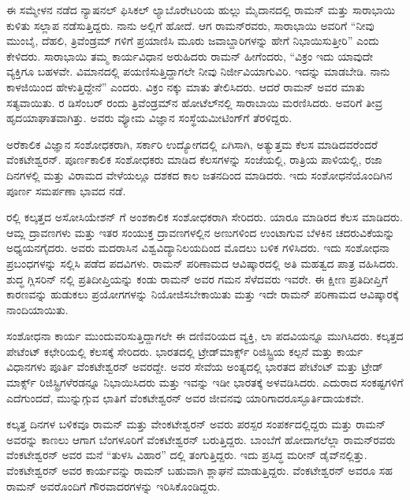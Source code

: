 ಈ ಸಮ್ಮೇಳನ ನಡೆದ ನ್ಯಾಷನಲ್ ಫಿಸಿಕಲ್ ಲ್ಯಾಬೊರೇಟರಿಯ ಹುಲ್ಲು ಮೈದಾನದಲ್ಲಿ ರಾಮನ್ ಮತ್ತು ಸಾರಾಭಾಯಿ ಕುಳಿತು ಸಲ್ಲಾಪ ನಡೆಸುತ್ತಿದ್ದರು. ನಾನು ಅಲ್ಲಿಗೆ ಹೋದೆ. ಆಗ ರಾಮನ್‍ರವರು, ಸಾರಾಭಾಯಿ ಅವರಿಗೆ  “ನೀವು ಮುಂಬೈ, ದೆಹಲಿ, ತ್ರಿವೆಂಡ್ರಮ್ ಗಳಿಗೆ ಪ್ರಯಾಣಿಸಿ ಮೂರು ಜವಾಬ್ದಾರಿಗಳನ್ನು ಹೇಗೆ ನಿಭಾಯಿಸುತ್ತೀರಿ” ಎಂದು ಕೇಳಿದರು. ಸಾರಾಭಾಯಿ ತಮ್ಮ ಕಾರ್ಯವಿಧಾನ ಅರುಹಿದರು ರಾಮನ್ ಹೀಗೆಂದರು, “ವಿಕ್ರಂ ಇದು ಯಾವುದೇ ವ್ಯಕ್ತಿಗೂ ಬಹಳವೇ. ವಿಮಾನದಲ್ಲಿ ಪಯಣಿಸುತ್ತಿದ್ದಾಗಲೇ ನೀವು ನಿರ್ಜೀವಿಯಾಗುವಿರಿ. ಇದನ್ನು ಮಾಡಬೇಡಿ. ನಾನು ಕಾಳಜಿಯಿಂದ ಹೇಳುತ್ತಿದ್ದೇನೆ” ಎಂದರು. ವಿಕ್ರಂ ನಕ್ಕು ಮಾತು ತೇಲಿಸಿದರು. ಆದರೆ ರಾಮನ್ ಅವರ ಮಾತು ಸತ್ಯವಾಯಿತು. ರ ಡಿಸೆಂಬರ್ ರಂದು ತ್ರಿವೆಂಡ್ರಮ್‍ನ ಹೋಟೆಲ್‍ನಲ್ಲಿ ಸಾರಾಬಾಯಿ ಮರಣಿಸಿದರು. ಅವರಿಗೆ ತೀವ್ರ ಹೃದಯಾಘಾತವಾಗಿತ್ತು. ಅವರು ವ್ಯೋಮ ವಿಜ್ಞಾನ ಸಂಸ್ಥೆಯ\break ಮೀಟಿಂಗ್‍ಗೆ ತೆರಳಿದ್ದರು.



ಅರೆಕಾಲಿಕ ವಿಜ್ಞಾನ ಸಂಶೋಧಕರಾಗಿ, ಸರ್ಕಾರಿ ಉದ್ಯೋಗದಲ್ಲಿ ಏಗಿಸಾಗಿ, ಅತ್ಯುತ್ತಮ ಕೆಲಸ ಮಾಡಿದವರೆಂದರೆ ವೆಂಕಟೇಶ್ವರನ್. ಪೂರ್ಣಕಾಲಿಕ ಸಂಶೋಧಕರು ಮಾಡಿದ ಕೆಲಸಗಳನ್ನು ಸಂಜೆಯಲ್ಲಿ, ರಾತ್ರಿಯ ಪಾಳಿಯಲ್ಲಿ, ರಜಾ ದಿನಗಳಲ್ಲಿ ಮತ್ತು ವಿರಾಮದ ವೇಳೆಯಲ್ಲೂ ದಶಕದ ಕಾಲ ಜತನದಿಂದ ಮಾಡಿದರು. ಇದು ಸಂಶೋಧನೆಯೊಂದಿಗಿನ ಪೂರ್ಣ ಸಮರ್ಪಣಾ ಭಾವದ ನಡೆ.

ರಲ್ಲಿ ಕಲ್ಕತ್ತದ ಅಸೋಸಿಯೇಶನ್ ಗೆ ಅಂಶಕಾಲಿಕ ಸಂಶೋಧಕರಾಗಿ ಸೇರಿದರು. ಯಾರೂ ಮಾಡಿರದ ಕೆಲಸ ಮಾಡಿದರು. ಆಮ್ಲ ದ್ರಾವಣಗಳು ಮತ್ತು ಇತರ ಸಂಯುಕ್ತ ದ್ರಾವಣಗಳಲ್ಲಿನ ಅಣುಗಳಿಂದ ಉಂಟಾಗುವ ಬೆಳಕಿನ ಚದರುವಿಕೆಯನ್ನು ಅಧ್ಯಯನಗೈದರು. ಅವರು ಮದರಾಸಿನ ವಿಶ್ವವಿದ್ಯಾನಿಲಯದಿಂದ ಮೊದಲು  ಬಳಿಕ  ಗಳಿಸಿದರು. ಇದು ಸಂಶೋಧನಾ ಪ್ರಬಂಧಗಳನ್ನು ಸಲ್ಲಿಸಿ ಪಡೆದ ಪದವಿಗಳು. ರಾಮನ್ ಪರಿಣಾಮದ ಆವಿಷ್ಕಾರದಲ್ಲಿ ಅತಿ ಮಹತ್ವದ ಪಾತ್ರ ವಹಿಸಿದರು. ಶುದ್ಧ ಗ್ಲಿಸರಿನ್ ನಲ್ಲಿ ಪ್ರತಿದೀಪ್ತಿಯನ್ನು ಕಂಡು ರಾಮನ್ ಅವರ ಗಮನ ಸೆಳೆದವರು ಇವರೇ. ಈ ಕ್ಷೀಣ ಪ್ರತಿದೀಪ್ತಿಗೆ ಕಾರಣವನ್ನು ಹುಡುಕಲು ಪ್ರಯೋಗಗಳನ್ನು ನಿಯೋಜಿಸಬೇಕಾಯಿತು ಮತ್ತು ಇದೇ ರಾಮನ್ ಪರಿಣಾಮದ ಆವಿಷ್ಕಾರಕ್ಕೆ ನಾಂದಿಯಾಯಿತು.

ಸಂಶೋಧನಾ ಕಾರ್ಯ ಮುಂದುವರಿಸುತ್ತಿದ್ದಾಗಲೇ ಈ ದಣಿವರಿಯದ ವ್ಯಕ್ತಿ, ಲಾ ಪದವಿ\-ಯನ್ನೂ ಮುಗಿಸಿದರು. ಕಲ್ಕತ್ತದ ಪೇಟೆಂಟ್ ಕಛೇರಿಯಲ್ಲಿ ಕೆಲಸಕ್ಕೆ ಸೇರಿದರು. ಭಾರತದಲ್ಲಿ ಟ್ರೇಡ್‌ಮಾರ್ಕ್ಸ್ ರಿಜಿಸ್ಟ್ರಿಯ ಕಲ್ಪನೆ ಮತ್ತು ಕಾರ್ಯ ವಿಧಾನಗಳು ಪೂರ್ತಿ ವೆಂಕಟೇಶ್ವರನ್ ಅವರದ್ದೇ. ಅವರ ಸೇವೆಯ ಅಂತ್ಯದಲ್ಲಿ ಭಾರತದ ಪೇಟೆಂಟ್ ಮತ್ತು ಟ್ರೇಡ್ ಮಾರ್ಕ್ಸ್ ರಿಜಿಸ್ಟ್ರಿಗಳೆರಡನ್ನೂ ನಿಭಾಯಿಸಿದರು ಮತ್ತು ಇವನ್ನು ಇಡೀ ಭಾರತಕ್ಕೆ ಅಳವಡಿಸಿದರು. ಎದುರಾದ ಸಂಕಷ್ಟಗಳಿಗೆ ಎದೆಗುಂದದೆ, ಮುನ್ನುಗ್ಗುವ ಛಾತಿಗೆ ವೆಂಕಟೇಶ್ವರನ್ ಅವರ ಜೀವನವು ಯಾರಿಗಾದರೂ\break ಸ್ಫೂರ್ತಿದಾಯಕವೇ.

\vskip 2pt

ಕಲ್ಕತ್ತ ದಿನಗಳ ಬಳಿಕವೂ ರಾಮನ್ ಮತ್ತು ವೇಂಕಟೇಶ್ವರನ್ ಅವರು ಪರಸ್ಪರ ಸಂಪರ್ಕದಲ್ಲಿದ್ದರು ಮತ್ತು ರಾಮನ್ ಅವರನ್ನು ಕಾಣಲು ಆಗಾಗ ಬೆಂಗಳೂರಿಗೆ ವೆಂಕಟೇಶ್ವರನ್ ಬರುತ್ತಿದ್ದರು. ಬಾಂಬೆಗೆ ಹೋದಾಗಲೆಲ್ಲಾ ರಾಮನ್‍ರವರು ವೆಂಕಟೇಶ್ವರನ್ ಅವರ ಮನೆ “ತುಳಸಿ ವಿಹಾರ” ದಲ್ಲಿ ತಂಗುತ್ತಿದ್ದರು. ಇದು ಪ್ರಸಿದ್ಧ ಮರೀನ್ ಡೈವ್‍ನಲ್ಲಿತ್ತು. ವೆಂಕಟೇಶ್ವರನ್ ಅವರ ಕಾರ್ಯವನ್ನು ರಾಮನ್ ಬಹುವಾಗಿ ಶ್ಲಾಘನೆ ಮಾಡುತ್ತಿದ್ದರು. ವೆಂಕಟೇಶ್ವರನ್ ಅವರೂ ಸಹ ರಾಮನ್ ಅವರೊಂದಿಗೆ ಗೌರವಾದರಗಳನ್ನು ಇರಿಸಿಕೊಂಡಿದ್ದರು.


